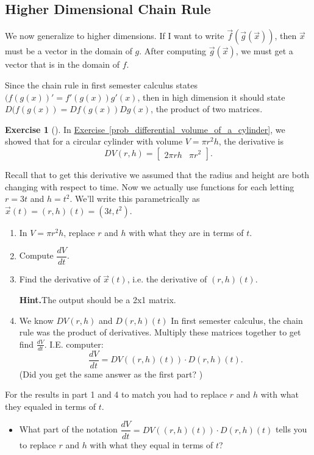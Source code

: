 \documentclass[10pt,]{book}
\theoremstyle{plain}
\theoremstyle{definition}
\theoremstyle{definition}
\theoremstyle{definition}
\theoremstyle{definition}
\newtheorem{exploration}[project]{Exercise}
\theoremstyle{definition}
\numberwithin{equation}{section}
\newcommand{\amp}{&}
\begin{document}
\subsection[{Higher Dimensional Chain Rule}]{Higher Dimensional Chain Rule}\label{subsection-35}
We now generalize to higher dimensions. If I want to write \(\vec f(\vec g(\vec x))\), then \(\vec x\) must be a vector in the domain of \(g\). After computing \(\vec g(\vec x)\), we must get a vector that is in the domain of \(f\).%
\par
Since the chain rule in first semester calculus states \((f(g(x))'=f'(g(x))g'(x)\), then in high dimension it should state \(D(f(g(x)) = Df(g(x))Dg(x)\), the product of two matrices.%
\begin{exploration}[]\label{chain_rule_two}
In \hyperref[prob_differential_volume_of_a_cylinder]{Exercise~\ref{prob_differential_volume_of_a_cylinder}}, we showed that for a circular cylinder with volume \(V=\pi r^2 h\), the derivative is%
\begin{equation*}
DV(r,h)=\begin{bmatrix}2\pi rh \amp  \pi r^2
\end{bmatrix} .
\end{equation*}
%
\par
Recall that to get this derivative we assumed that the radius and height are both changing with respect to time. Now we actually use functions for each letting \(r=3t\) and \(h=t^2\). We'll write this parametrically as \(\vec x (t) = (r,h)(t) = (3t, t^2)\).%
\begin{enumerate}[font=\bfseries,label=(\alph*),ref=\alph*]
\item\label{task-336} In \(V=\pi r^2 h\), replace \(r\) and \(h\) with what they are in terms of \(t\).%
\item\label{task-337} Compute \(\dfrac{dV}{dt}\).%
\item\label{task-338} Find the derivative of \(\vec x (t)\), i.e. the derivative of \((r,h)(t)\).%
\par\medskip\noindent%
\textbf{Hint.}\quad The output should be a 2x1 matrix.%
\item\label{task-339} We know \(DV(r,h)\) and \(D(r,h)(t)\) In first semester calculus, the chain rule was the product of derivatives. Multiply these matrices together to get find \(\frac{dV}{dt}\). I.E. computer:%
\begin{equation*}
\dfrac{dV}{dt}=DV((r,h)(t))\cdot D(r,h)(t).
\end{equation*}
(Did you get the same answer as the first part? )%
\end{enumerate}
\bigbreak
For the results in part 1 and 4 to match you had to replace \(r\) and \(h\) with what they equaled in terms of \(t\). \leavevmode%
\begin{itemize}[label=\textbullet]
\item{}What part of the notation \(\dfrac{dV}{dt}=DV((r,h)(t))\cdot D(r,h)(t)\) tells you to replace \(r\) and \(h\) with what they equal in terms of \(t\)?%
\end{itemize}
%
\end{exploration}
\typeout{************************************************}
\typeout{************************************************}
\end{document}

